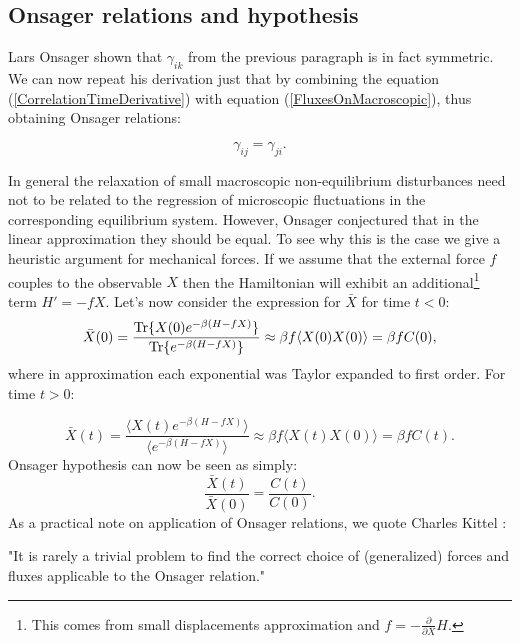 \documentclass[a4paper,12pt]{article}
\begin{document}
\subsection{Onsager relations and hypothesis}
\label{OnsagerRelationsSection}

Lars Onsager \cite{Onsager:zgWBDrcO} shown that $\gamma_{ik}$ from the previous paragraph is in fact symmetric. We can now repeat his derivation just that by combining the equation (\ref{CorrelationTimeDerivative}) with equation (\ref{FluxesOnMacroscopic}), thus obtaining Onsager relations:

\begin{equation}
\label{OnsagerRelations}
  \gamma_{ij}=\gamma_{ji}.
\end{equation}

In general the relaxation of small macroscopic non-equilibrium disturbances need not to be related to the regression of microscopic fluctuations in the corresponding equilibrium system. 
However, Onsager conjectured that in the linear approximation they should be equal. To see why this is the case we give a heuristic argument for mechanical forces.
If we assume that the external force $f$ couples to the observable $X$ then the Hamiltonian will exhibit an additional\footnote{This comes from small displacements approximation and $f=-\frac{\partial}{\partial{X}} H$.} term $H'=-f X$.
Let's now consider the expression for $\bar{X}$ for time $t < 0$:
\begin{equation}
  \bar{X}(0)=\frac{\Tr\{ X(0) e^{-\beta (H-f X)} \}}{\Tr\{ e^{-\beta (H-f X)} \}} \approx \beta f \langle X(0)X(0) \rangle= \beta f C(0),
\end{equation}
where in approximation each exponential was Taylor expanded to first order.
For time $t>0$:

\begin{equation}
  \bar{X}(t)=\frac{\langle X(t) e^{-\beta (H-f X)} \rangle}{\langle e^{-\beta (H-f X)} \rangle} \approx \beta f \langle X(t)X(0) \rangle= \beta f C(t).
\end{equation}
Onsager hypothesis can now be seen as simply:
\begin{equation}
  \frac{\bar{X}(t)}{\bar{X}(0)}=\frac{C(t)}{C(0)}.
\end{equation}
As a practical note on application of Onsager relations, we quote Charles Kittel \cite{Kittel:817295}:
\begin{displayquote}
"It is rarely a trivial problem to find the correct choice of (generalized) forces and fluxes applicable to the Onsager relation."
\end{displayquote}
\end{document}
